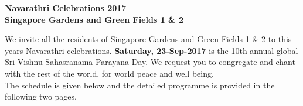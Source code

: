 \documentclass[12pt]{article}
\begin{document}
\pagestyle{empty}
\begin{center}
\textbf{Navarathri Celebrations 2017\\Singapore Gardens and Green Fields 1 \& 2}\\
\end{center}
We invite all the residents of Singapore Gardens and Green Fields 1 \& 2 to this year\textquotesingle s Navarathri celebrations. \textbf{Saturday, 23-Sep-2017} is the 10th annual global  \underline{\textquotesingle Sri Vishnu Sahasranama Parayana Day\textquotesingle .} We request you to congregate and chant with the rest of the world, for world peace and well being. \\The schedule is given below and the detailed programme is provided in the following two pages.
\end{document}
